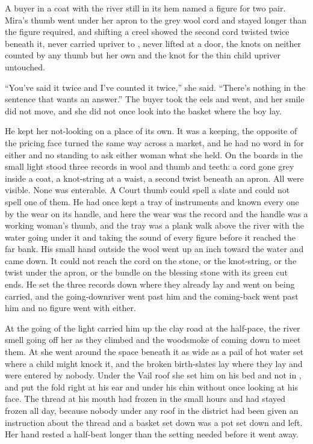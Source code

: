 A buyer in a coat with the river still in its hem named a figure for two pair. Mira's thumb went under her apron to the grey wool cord and stayed longer than the figure required, and shifting a creel showed the second cord twisted twice beneath it, never carried upriver to , never lifted at a door, the knots on neither counted by any thumb but her own and the knot for the thin child upriver untouched.

“You've said it twice and I've counted it twice,” she said. “There's nothing in the sentence that wants an answer.” The buyer took the eels and went, and her smile did not move, and she did not once look into the basket where the boy lay.

He kept her not-looking on a place of its own. It was a keeping, the opposite of the pricing face turned the same way across a market, and he had no word in  for either and no standing to ask either woman what she held. On the boards in the small light stood three records in wool and thumb and teeth: a cord gone grey inside a coat, a knot-string at a waist, a second twist beneath an apron. All were visible. None was enterable. A Court thumb could spell a slate and could not spell one of them. He had once kept a tray of instruments and known every one by the wear on its handle, and here the wear was the record and the handle was a working woman's thumb, and the tray was a plank walk above the river with the water going under it and taking the sound of every figure before it reached the far bank. His small hand outside the wool went up an inch toward the water and came down. It could not reach the cord on the stone, or the knot-string, or the twist under the apron, or the bundle on the blessing stone with its green cut ends. He set the three records down where they already lay and went on being carried, and the going-downriver went past him and the coming-back went past him and no figure went with either.

\scenebreak

At the going of the light  carried him up the clay road at the half-pace, the river smell going off her as they climbed and the woodsmoke of  coming down to meet them. At  she went around the space beneath it as wide as a pail of hot water set where a child might knock it, and the broken birth-slates lay where they lay and were entered by nobody. Under the Vail roof she set him on his bed and not in , and put the fold right at his ear and under his chin without once looking at his face. The thread at his mouth had frozen in the small hours and had stayed frozen all day, because nobody under any roof in the district had been given an instruction about the thread and a basket set down was a pot set down and left. Her hand rested a half-beat longer than the setting needed before it went away.

